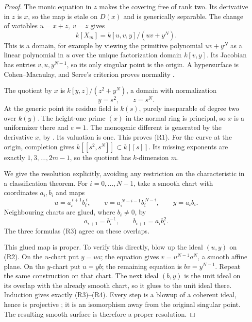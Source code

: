 \begin{proof}
The monic equation in \(z\) makes the covering free of rank two.
Its derivative in \(z\) is \(x\), so the map is etale on \(D(x)\)
and is generically separable.
The change of variables \(u=x+z,\ v=z\) gives
\[
 k[X_m]=k[u,v,y]/(uv+y^N).
 \tag{R2}
\]
This is a domain, for example by viewing the primitive polynomial
\(uv+y^N\) as a linear polynomial in \(u\) over the unique
factorization domain \(k[v,y]\).
Its Jacobian has entries \(v,u,y^{N-1}\), so its only singular
point is the origin. A hypersurface is Cohen--Macaulay, and
Serre's criterion proves normality
\cite[Tag 031S]{StacksRationalChainB}.

The quotient by \(x\) is
\(k[y,z]/(z^2+y^N)\), a domain with normalization
\[
 y=s^2,\qquad z=s^N.
\]
At the generic point its residue field is \(k(s)\), purely
inseparable of degree two over \(k(y)\). The height-one prime
\((x)\) in the normal ring is principal, so \(x\) is a uniformizer
there and \(e=1\). The monogenic different is generated by
the derivative \(x\), by
\cite[Example 49.12.5, tag 0BWB]{StacksRationalChainB}.
Its valuation is one. This proves (R1).
For the curve at the origin, completion gives
\(k[[s^2,s^N]]\subset k[[s]]\). Its missing exponents are exactly
\(1,3,\ldots,2m-1\), so the quotient has \(k\)-dimension \(m\).

We give the resolution explicitly, avoiding any restriction on
the characteristic in a classification theorem.
For \(i=0,\ldots,N-1\), take a smooth chart with coordinates
\(a_i,b_i\) and maps
\[
 u=a_i^{\,i+1}b_i^{\,i},\qquad
 v=a_i^{\,N-i-1}b_i^{\,N-i},\qquad y=a_i b_i.
 \tag{R3}
\]
Neighbouring charts are glued, where \(b_i\ne0\), by
\[
 a_{i+1}=b_i^{-1},\qquad b_{i+1}=a_i b_i^2.
 \tag{R4}
\]
The three formulas (R3) agree on these overlaps.

This glued map is proper. To verify this directly, blow up the
ideal \((u,y)\) on (R2). On the \(u\)-chart put \(y=ua\);
the equation gives \(v=u^{N-1}a^N\), a smooth affine plane.
On the \(y\)-chart put \(u=yb\); the remaining equation is
\(bv=y^{N-1}\). Repeat the same construction on that chart.
The next ideal \((b,y)\) is the unit ideal on its overlap with
the already smooth chart, so it glues to the unit ideal there.
Induction gives exactly (R3)--(R4). Every step is a blowup of
a coherent ideal, hence is projective
\cite[Tag 02NS]{StacksRationalChainB}; it is an isomorphism
away from the original singular point. The resulting smooth
surface is therefore a proper resolution.


\end{proof}
